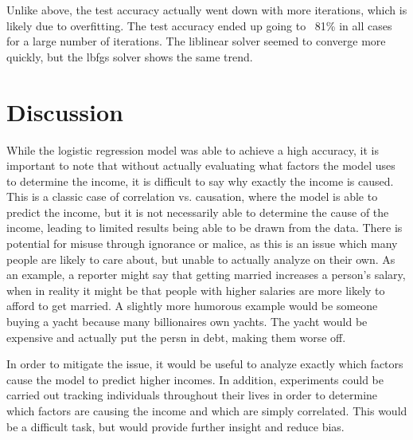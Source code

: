 \documentclass[12pt]{article}
\begin{document}
Unlike above, the test accuracy actually went down with more iterations, which is 
likely due to overfitting. The test accuracy ended up going to ~81\% in all 
cases for a large number of iterations. The liblinear solver seemed to converge 
more quickly, but the lbfgs solver shows the same trend. 

\section{Discussion}

While the logistic regression model was able to achieve a high accuracy,
 it is important to note that without actually evaluating what factors the 
 model uses to determine the income, it is difficult to say why 
 exactly the income is caused. This is a classic case of correlation vs.
 causation, where the model is able to predict the income, but it is not
 necessarily able to determine the cause of the income, leading to limited 
 results being able to be drawn from the data. There is potential for misuse 
 through ignorance or malice, as this is an issue which many people are likely to care 
 about, but unable to actually analyze on their own. As an example, a reporter
 might say that getting married increases a person's salary, when in reality 
 it might be that people with higher salaries are more likely to afford to 
 get married. A slightly more humorous example would be someone buying a 
 yacht because many billionaires own yachts. The yacht would be expensive 
 and actually put the persn in debt, making them worse off.

 In order to mitigate the issue, it would be useful to analyze exactly 
 which factors cause the model to predict higher incomes. In addition, 
 experiments could be carried out tracking individuals throughout their 
 lives in order to determine which factors are causing the income and which 
 are simply correlated. This would be a difficult task, but would provide
 further insight and reduce bias.
\end{document}
